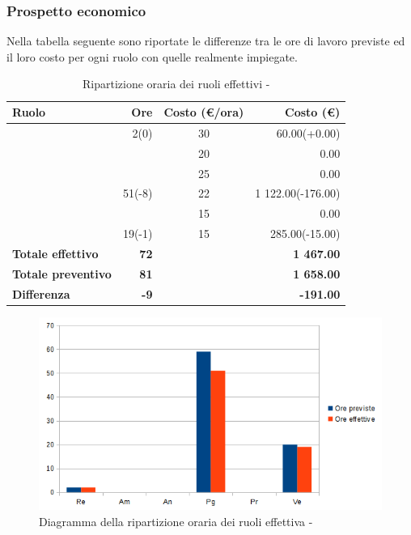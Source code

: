 \documentclass[12pt,a4paper]{article}
\begin{document}
\subsubsection{Prospetto economico}
Nella tabella seguente sono riportate le differenze tra le ore di lavoro previste ed il loro costo per ogni ruolo con quelle realmente impiegate.

\begin{table}[H]
	\begin{center}
		\begin{tabular}{l r c r}
			\toprule
			\textbf{Ruolo}	& \textbf{Ore} & \textbf{Costo (\euro/ora)}	& \textbf{Costo (\euro)} \\ \midrule
			\midrule
            \RE{} &2(0) & 30 & 60.00(+0.00) \\ \midrule
			\AM{} & & 20 & 0.00 \\ \midrule
			\AN{} & & 25 & 0.00 \\ \midrule
            \PG{} & 51(-8) & 22 & 1 122.00(-176.00) \\ \midrule
			\PR{} & & 15 & 0.00 \\ \midrule
            \VR{} & 19(-1) & 15 & 285.00(-15.00) \\ \midrule
            \textbf{Totale effettivo} & \textbf{72} &  & \textbf{1 467.00} \\ \midrule
			\textbf{Totale preventivo} & \textbf{81} &  & \textbf{1 658.00} \\ \midrule
			\textbf{Differenza} & \textbf{-9} &  & \textbf{-191.00} \\ \midrule
			\bottomrule
		\end{tabular}
		\caption{Ripartizione oraria dei ruoli effettivi - \FPA{}}
	\end{center}
\end{table}

\begin{center}
	\begin{figure}[H]
		\centering
		\includegraphics[width=\textwidth]{../img/diagrammaBarreProgettazioneArchitetturaleConsuntivo.png}
		\caption{Diagramma della ripartizione oraria dei ruoli effettiva - \FA{}}
	\end{figure}
\end{center}
\end{document}
